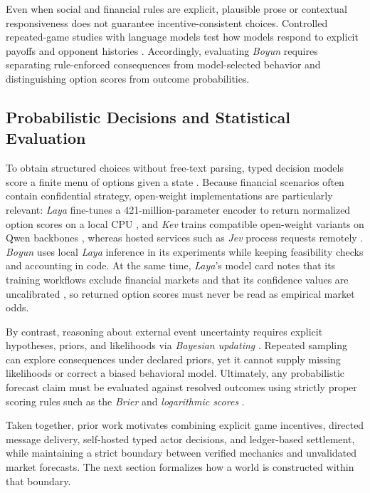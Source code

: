 Even when social and financial rules are explicit, plausible prose or
contextual responsiveness does not guarantee incentive-consistent choices.
Controlled repeated-game studies with language models test how models respond
to explicit payoffs and opponent histories \cite{akata2025}. Accordingly,
evaluating \textit{Boyun} requires separating rule-enforced consequences from
model-selected behavior and distinguishing option scores from outcome
probabilities.

\subsection{Probabilistic Decisions and Statistical Evaluation}
To obtain structured choices without free-text parsing, typed decision
models score a finite menu of options given a state \cite{typesafeintro,typesafeapi}.
Because financial scenarios often contain confidential strategy, open-weight
implementations are particularly relevant: \textit{Laya} fine-tunes a
421-million-parameter encoder to return normalized option scores on a local CPU
\cite{layamodel}, and \textit{Kev} trains compatible open-weight variants on
Qwen backbones \cite{kevrepo}, whereas hosted services such as \textit{Jev}
process requests remotely \cite{typesafeapi}. \textit{Boyun} uses local
\textit{Laya} inference in its experiments while keeping feasibility checks and
accounting in code. At the same time, \textit{Laya}'s model card notes
that its training workflows exclude financial markets and that its confidence
values are uncalibrated \cite{layamodel}, so returned option scores must never
be read as empirical market odds.

By contrast, reasoning about external event uncertainty requires explicit
hypotheses, priors, and likelihoods via \textit{Bayesian updating}
\cite{pishronik2014}. Repeated sampling can explore consequences under declared
priors, yet it cannot supply missing likelihoods or correct a biased behavioral
model. Ultimately, any probabilistic forecast claim must be evaluated against
resolved outcomes using strictly proper scoring rules such as the
\textit{Brier} and \textit{logarithmic scores} \cite{brier1950,gneiting2007}.

Taken together, prior work motivates combining explicit game incentives,
directed message delivery, self-hosted typed actor decisions, and ledger-based
settlement, while maintaining a strict boundary between verified mechanics and
unvalidated market forecasts. The next section formalizes how a world is
constructed within that boundary.
